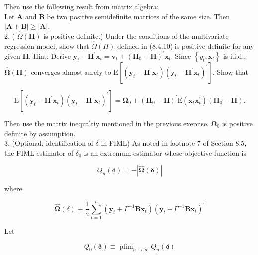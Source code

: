 \documentclass[10pt]{article}
\begin{document}
Then use the following result from matrix algebra:\\
Let $\mathbf{A}$ and $\mathbf{B}$ be two positive semidefinite matrices of the same size. Then $|\mathbf{A}+\mathbf{B}| \geq|\mathbf{A}|$.\\
2. ( $\widehat{\Omega}(\boldsymbol{\Pi})$ is positive definite.) Under the conditions of the multivariate regression model, show that $\widehat{\Omega}(\Pi)$ defined in (8.4.10) is positive definite for any given $\boldsymbol{\Pi}$. Hint: Derive $\mathbf{y}_{t}-\boldsymbol{\Pi}^{\prime} \mathbf{x}_{t}=\mathbf{v}_{t}+\left(\boldsymbol{\Pi}_{0}-\boldsymbol{\Pi}\right)^{\prime} \mathbf{x}_{t}$. Since $\left\{y_{t}, \mathbf{x}_{t}\right\}$ is i.i.d., $\widehat{\boldsymbol{\Omega}}(\boldsymbol{\Pi})$ converges almost surely to $\mathrm{E}\left[\left(\mathbf{y}_{t}-\boldsymbol{\Pi}^{\prime} \mathbf{x}_{t}\right)\left(\mathbf{y}_{t}-\boldsymbol{\Pi}^{\prime} \mathbf{x}_{t}\right)^{\prime}\right]$. Show that

$$
\mathrm{E}\left[\left(\mathbf{y}_{t}-\boldsymbol{\Pi}^{\prime} \mathbf{x}_{t}\right)\left(\mathbf{y}_{t}-\boldsymbol{\Pi}^{\prime} \mathbf{x}_{t}\right)^{\prime}\right]=\boldsymbol{\Omega}_{0}+\left(\boldsymbol{\Pi}_{0}-\boldsymbol{\Pi}\right)^{\prime} \mathrm{E}\left(\mathbf{x}_{t} \mathbf{x}_{t}^{\prime}\right)\left(\boldsymbol{\Pi}_{0}-\boldsymbol{\Pi}\right) .
$$

Then use the matrix inequaltiy mentioned in the previous exercise. $\boldsymbol{\Omega}_{0}$ is positive definite by assumption.\\
3. (Optional, identification of $\delta$ in FIML) As noted in footnote 7 of Section 8.5, the FIML estimator of $\delta_{0}$ is an extremum estimator whose objective function is


\begin{equation*}
Q_{n}(\boldsymbol{\delta})=-|\widehat{\boldsymbol{\Omega}}(\boldsymbol{\delta})| \tag{2}
\end{equation*}


where


\begin{equation*}
\widehat{\boldsymbol{\Omega}}(\delta) \equiv \frac{1}{n} \sum_{t=1}^{n}\left(\mathbf{y}_{t}+\Gamma^{-1} \mathbf{B} \mathbf{x}_{t}\right)\left(\mathbf{y}_{t}+\Gamma^{-1} \mathbf{B} \mathbf{x}_{t}\right)^{\prime} \tag{3}
\end{equation*}


Let


\begin{equation*}
Q_{0}(\boldsymbol{\delta}) \equiv \operatorname{plim}_{n \rightarrow \infty} Q_{n}(\boldsymbol{\delta}) \tag{4}
\end{equation*}
\end{document}
